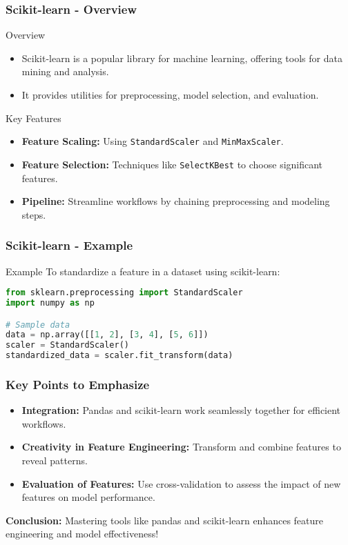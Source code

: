 \documentclass[aspectratio=169]{beamer}
\begin{document}
\begin{frame}[fragile]
    \frametitle{Scikit-learn - Overview}
    \begin{block}{Overview}
        \begin{itemize}
            \item Scikit-learn is a popular library for machine learning, offering tools for data mining and analysis.
            \item It provides utilities for preprocessing, model selection, and evaluation.
        \end{itemize}
    \end{block}

    \begin{block}{Key Features}
        \begin{itemize}
            \item \textbf{Feature Scaling:} Using \texttt{StandardScaler} and \texttt{MinMaxScaler}.
            \item \textbf{Feature Selection:} Techniques like \texttt{SelectKBest} to choose significant features.
            \item \textbf{Pipeline:} Streamline workflows by chaining preprocessing and modeling steps.
        \end{itemize}
    \end{block}
\end{frame}

\begin{frame}[fragile]
    \frametitle{Scikit-learn - Example}
    \begin{block}{Example}
        To standardize a feature in a dataset using scikit-learn:

        \begin{lstlisting}[language=Python]
from sklearn.preprocessing import StandardScaler
import numpy as np

# Sample data
data = np.array([[1, 2], [3, 4], [5, 6]])
scaler = StandardScaler()
standardized_data = scaler.fit_transform(data)
        \end{lstlisting}
    \end{block}
\end{frame}

\begin{frame}[fragile]
    \frametitle{Key Points to Emphasize}
    \begin{itemize}
        \item \textbf{Integration:} Pandas and scikit-learn work seamlessly together for efficient workflows.
        \item \textbf{Creativity in Feature Engineering:} Transform and combine features to reveal patterns.
        \item \textbf{Evaluation of Features:} Use cross-validation to assess the impact of new features on model performance.
    \end{itemize}
    
    \textbf{Conclusion:} Mastering tools like pandas and scikit-learn enhances feature engineering and model effectiveness!
\end{frame}
\end{document}
